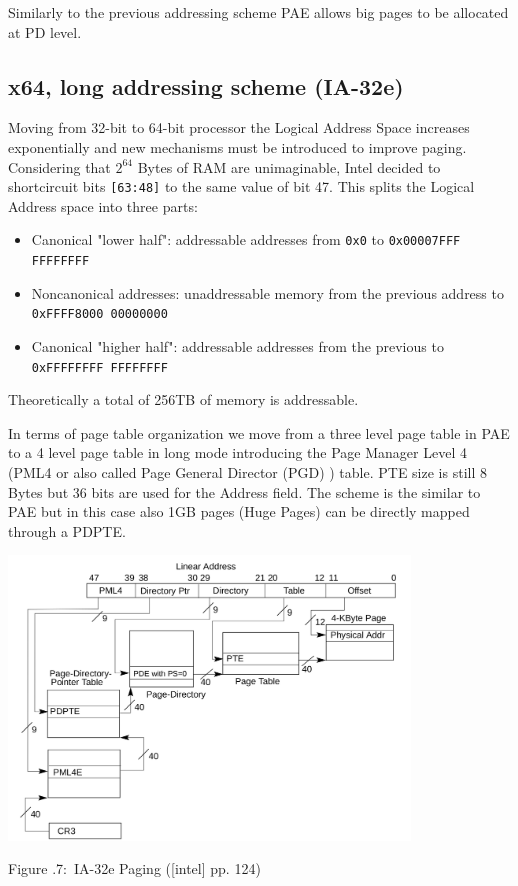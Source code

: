 \documentclass[twoside]{article}
\newcounter{lecnum}
\renewcommand{\cite}[1]{[#1]}
\newcommand{\fig}[3]{
            \vspace{#2}
            \begin{center}
            Figure \thelecnum.#1:~#3
            \end{center}
    }
\begin{document}
Similarly to the previous addressing scheme PAE allows big pages to be allocated at PD level. 

\subsection{x64, long addressing scheme (IA-32e)}

Moving from 32-bit to 64-bit processor the Logical Address Space increases exponentially and new mechanisms must be introduced to improve paging. Considering that $2^{64}$ Bytes of RAM are unimaginable, Intel decided to shortcircuit bits \texttt{[63:48]} to the same value of bit 47. This splits the Logical Address space into three parts:
\begin{itemize}
  \itemsep-3pt
  \item Canonical "lower half": addressable addresses from \texttt{0x0} to \texttt{0x00007FFF FFFFFFFF}
  \item Noncanonical addresses: unaddressable memory from the previous address to \texttt{0xFFFF8000 00000000}
  \item Canonical "higher half": addressable addresses from the previous to \texttt{0xFFFFFFFF FFFFFFFF}
\end{itemize}

Theoretically a total of 256TB of memory is addressable. 

In terms of page table organization we move from a three level page table in PAE to a 4 level page table in long mode introducing the Page Manager Level 4 (PML4 or also called Page General Director (PGD) ) table. PTE size is still 8 Bytes but 36 bits are used for the Address field. The scheme is the similar to PAE but in this case also 1GB pages (Huge Pages) can be directly mapped through a PDPTE. 


\begin{center}
  \includegraphics[width=0.8\textwidth]{x64pag.png}
  \fig{7}{0 pt}{IA-32e Paging (\cite{intel} pp. 124) }
\end{center}
\end{document}
